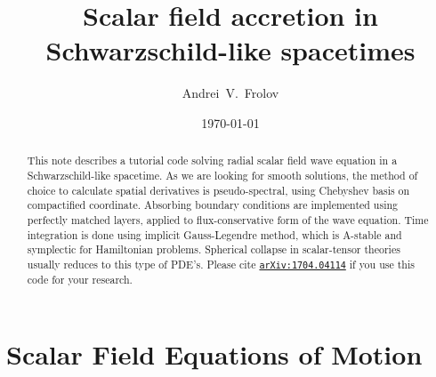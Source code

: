 \documentclass[aps,prd,reprint,twocolumn,groupedaddress]{revtex4-1}
\begin{document}

\title{Scalar field accretion in Schwarzschild-like spacetimes}

\author{Andrei~V.~Frolov}

\date{\today}

\begin{abstract}
  This note describes a tutorial code solving radial scalar field wave equation in a Schwarzschild-like spacetime. As we are looking for smooth solutions, the method of choice to calculate spatial derivatives is pseudo-spectral, using Chebyshev basis on compactified coordinate. Absorbing boundary conditions are implemented using perfectly matched layers, applied to flux-conservative form of the wave equation. Time integration is done using implicit Gauss-Legendre method, which is A-stable and symplectic for Hamiltonian problems. Spherical collapse in scalar-tensor theories usually reduces to this type of PDE's. Please cite \href{https://arxiv.org/abs/1704.04114}{\texttt{arXiv:1704.04114}} if you use this code for your research.
\end{abstract}


\maketitle

\section{Scalar Field Equations of Motion}
\end{document}
